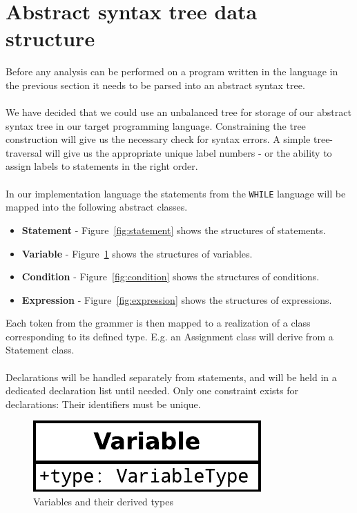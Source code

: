 \section{Abstract syntax tree data structure}\label{section:Abstractsyntaxtreedatastructure}
\label{sec:constructing_ast}
Before any analysis can be performed on a program written in the language in the previous section it needs to be parsed into an abstract syntax tree.\\\\
We have decided that we could use an unbalanced tree for storage of our abstract syntax tree in our target programming language. Constraining the tree construction will give us the necessary check for syntax errors.
A simple tree-traversal will give us the appropriate unique label numbers - or the ability to assign labels to statements in the right order.
\\
\\
In our implementation language the statements from the \texttt{WHILE} language will be mapped into the following abstract classes.
\begin{itemize}
	\item \textbf{Statement} - Figure~\ref{fig:statement} shows the structures of statements.
	\item \textbf{Variable} - Figure~\ref{fig:variable} shows the structures of variables.
	\item \textbf{Condition} - Figure~\ref{fig:condition} shows the structures of conditions.
	\item \textbf{Expression} - Figure~\ref{fig:expression} shows the structures of expressions.
\end{itemize}
Each token from the grammer is then mapped to a realization of a class corresponding to its defined type. E.g. an Assignment class will derive from a Statement class.
\\\\
Declarations will be handled separately from statements, and will be held in a dedicated declaration list until needed. Only one constraint exists for declarations: Their identifiers must be unique.


\begin{figure}[h]
	\centering
	\includegraphics[scale=.5]{../fig/Variable}
	\caption{Variables and their derived types}
	\label{fig:variable}
\end{figure}

